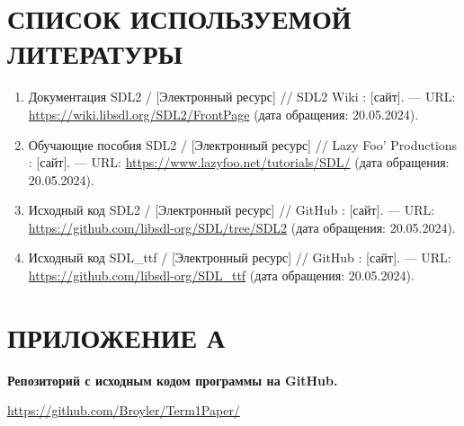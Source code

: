 \documentclass[14pt]{extarticle}
\begin{document}
{
    {
        \par
        \centering\section{СПИСОК ИСПОЛЬЗУЕМОЙ ЛИТЕРАТУРЫ}
        \par
    }

    \begin{enumerate}
        \item{
            Документация SDL2 /  [Электронный ресурс] // SDL2 Wiki : [сайт]. — URL: \url{https://wiki.libsdl.org/SDL2/FrontPage} (дата обращения: 20.05.2024).
        }
        \item{
            Обучающие пособия SDL2 /  [Электронный ресурс] // Lazy Foo' Productions : [сайт]. — URL: \url{https://www.lazyfoo.net/tutorials/SDL/} (дата обращения: 20.05.2024).
        }
        \item{
            Исходный код SDL2 /  [Электронный ресурс] // GitHub : [сайт]. — URL: \url{https://github.com/libsdl-org/SDL/tree/SDL2} (дата обращения: 20.05.2024).
        }
        \item{
            Исходный код SDL\_ttf /  [Электронный ресурс] // GitHub : [сайт]. — URL: \url{https://github.com/libsdl-org/SDL_ttf} (дата обращения: 20.05.2024).
        }
    \end{enumerate}

    \par
    \vfill
    \newpage
}

{
    {
        \par
        \centering\section{ПРИЛОЖЕНИЕ А}
        \par
    }
    \par
    {
        \par
        \centering
        \textbf{
            Репозиторий с исходным кодом программы на GitHub.
        }
        \par
    }
    \par

    \vspace{2em}
    \noindent\url{https://github.com/Broyler/Term1Paper/}

    \par
    \vfill
    \newpage
}
\end{document}
